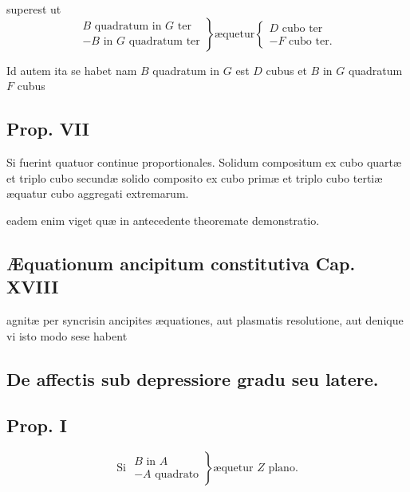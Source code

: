 \documentclass[11pt,a4paper]{article}
\begin{document}
superest ut
\[ \left.\begin{array}{l} B \text{ quadratum in } G \text{ ter} \\ - B \text{ in } G \text{ quadratum ter} \end{array}\right\} \text{æquetur} \left\{\begin{array}{l} D \text{ cubo ter} \\ - F \text{ cubo ter.} \end{array}\right. \]

Id autem ita se habet nam $B$ quadratum in $G$ est $D$ cubus et $B$ in $G$ quadratum $F$ cubus

\subsection*{Prop. VII}

Si fuerint quatuor continue proportionales. Solidum compositum ex cubo quartæ et triplo cubo secundæ  solido composito ex cubo primæ et triplo cubo tertiæ æquatur cubo aggregati extremarum.

eadem enim viget quæ in antecedente theoremate demonstratio.

\subsection*{Æquationum ancipitum constitutiva Cap. XVIII}

agnitæ per syncrisin ancipites æquationes, aut plasmatis resolutione, aut denique  vi isto modo sese habent

\subsection*{De affectis sub depressiore gradu seu latere.}

\subsection*{Prop. I}

\[ \text{Si } \left.\begin{array}{l} B \text{ in } A \\ - A \text{ quadrato} \end{array}\right\} \text{æquetur } Z \text{ plano.} \]
\end{document}
